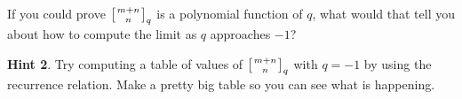 \documentclass{book}
\begin{document}
\begin{activity}
\begin{enumerate}[font=\bfseries,label=(\alph*),ref=\alph*]
\hypertarget{p-1643}{}%
If you could prove \(\left[{m+n\atop n}\right]_q\) is a polynomial function of \(q\), what would that tell you about how to compute the limit as \(q\) approaches \(-1\)?%
\par\smallskip%
\noindent\textbf{Hint 2}.\hypertarget{hint-224}{}\quad%
\hypertarget{p-1644}{}%
Try computing a table of values of \(\left[{m+n\atop n}\right]_q\) with \(q=-1\) by using the recurrence relation. Make a pretty big table so you can see what is happening.%
\par\smallskip%
\noindent\end{enumerate}
\end{activity}

\clearpage
\end{document}
